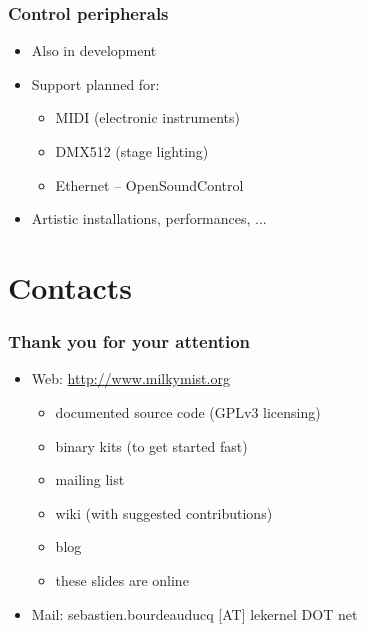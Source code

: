 \documentclass{beamer}
\begin{document}
\frame
{
  \frametitle{Control peripherals}
  
  \begin{itemize}
  \item Also in development
  \item Support planned for:
  \begin{itemize}
  \item MIDI (electronic instruments)
  \item DMX512 (stage lighting)
  \item Ethernet -- OpenSoundControl
  \end{itemize}
  \item Artistic installations, performances, ...
  \end{itemize}
}


\section{Contacts}
\frame
{
  \frametitle{Thank you for your attention}
  \begin{itemize}
  \item Web: \url{http://www.milkymist.org}
  \begin{itemize}
  \item documented source code (GPLv3 licensing)
  \item binary kits (to get started fast)
  \item mailing list
  \item wiki (with suggested contributions)
  \item blog
  \item these slides are online
  \end{itemize}
  \item Mail: sebastien.bourdeauducq [AT] lekernel DOT net
  \end{itemize}

  \begin{center}
  \end{center}
}
\end{document}
